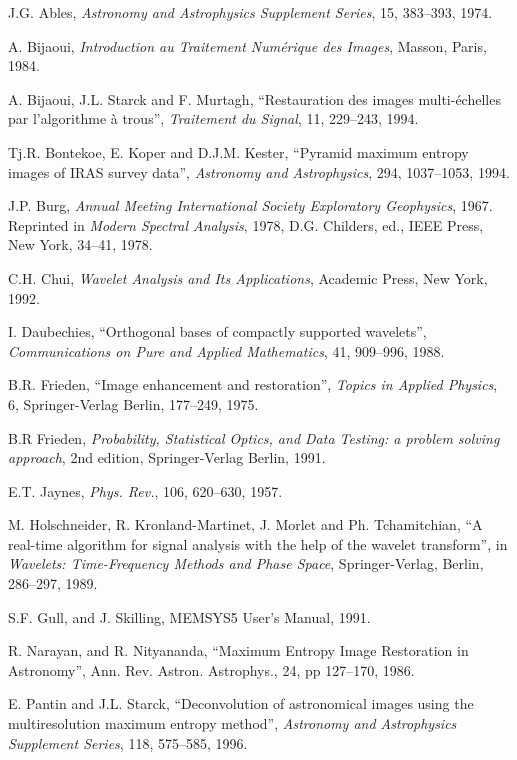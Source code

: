 \documentclass[11pt,a4paper]{article}
\begin{document}
\begin{thebibliography}{99}
 J.G. Ables, {\it Astronomy and Astrophysics Supplement Series},
15, 383--393, 1974.
 
 A. Bijaoui, {\it Introduction au 
Traitement Num\'erique des Images}, Masson, Paris, 1984.

  A. Bijaoui, J.L. Starck and 
 F. Murtagh, ``Restauration des 
 images
 multi-\'echelles par l'algorithme \`a trous'', {\it Traitement du Signal},
 11, 229--243, 1994.

 Tj.R. Bontekoe, E. Koper and D.J.M. Kester,   
``Pyramid maximum entropy images of IRAS survey data'', {\it Astronomy and
 Astrophysics}, 294, 1037--1053, 1994.

 J.P. Burg, {\it 
Annual Meeting International Society Exploratory Geophysics}, 1967. 
Reprinted in {\it Modern Spectral Analysis}, 1978, D.G. Childers, ed., 
IEEE Press, New York, 34--41, 1978.

  C.H. Chui, {\it Wavelet Analysis and Its 
 Applications}, Academic Press, New York, 1992.

  I. Daubechies, 
 ``Orthogonal bases of compactly supported 
 wavelets'', {\it Communications on Pure and Applied Mathematics}, 
 41, 909--996, 1988.

 B.R. Frieden, ``Image enhancement and restoration'', 
 {\it Topics in Applied Physics}, 6,  Springer-Verlag Berlin, 177--249, 1975.

 B.R Frieden, {\it Probability, Statistical Optics, and
Data Testing: a problem solving approach}, 2nd edition, Springer-Verlag Berlin, 
1991.

 E.T. Jaynes, {\it Phys. Rev.}, 106, 620--630, 1957.

  M. Holschneider, R. Kronland-Martinet, J. Morlet
 and Ph. Tchamitchian, ``A real-time algorithm for signal analysis with the
 help of the wavelet transform'', in 
 {\it Wavelets: Time-Frequency Methods and Phase Space}, 
 Springer-Verlag,  Berlin, 286--297, 1989.

 S.F. Gull, and J. Skilling, MEMSYS5 User's Manual, 1991.

 R. Narayan, and R. Nityananda, ``Maximum 
Entropy Image Restoration in Astronomy'', Ann. Rev. Astron. Astrophys., 
24, pp 127--170, 1986.

 E. Pantin and J.L. Starck, ``Deconvolution of 
astronomical images using the multiresolution maximum entropy method'', 
 {\it Astronomy and Astrophysics Supplement Series}, 118, 575--585, 1996. 


\end{thebibliography}
\end{document}
